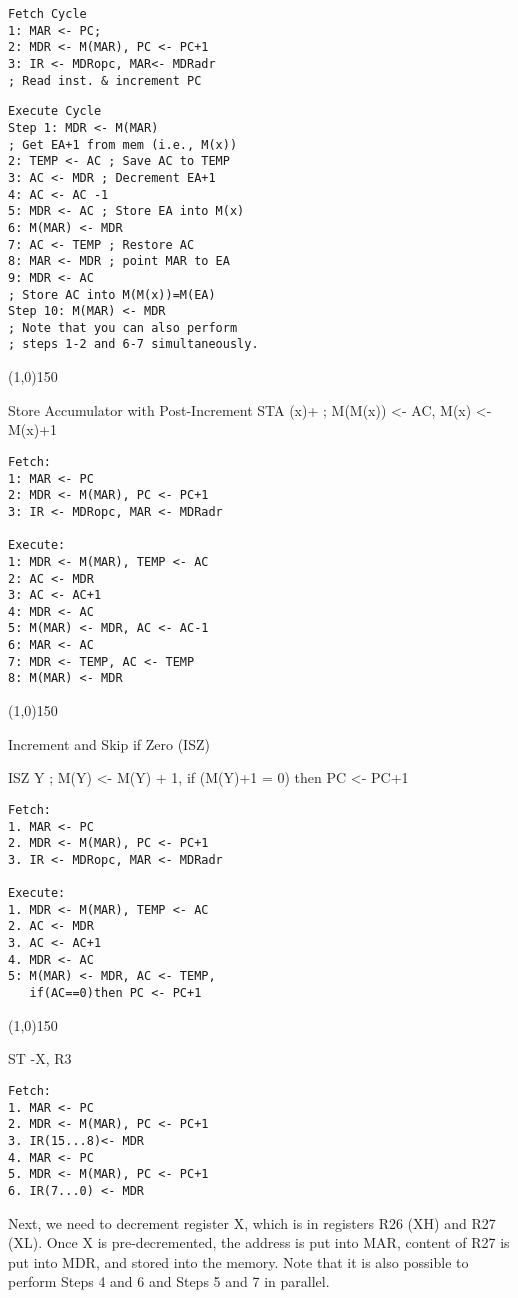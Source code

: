 \documentclass[8pt]{article}
\begin{document}
\begin{multicols}{3}
\begin{verbatim}
Fetch Cycle
1: MAR <- PC;
2: MDR <- M(MAR), PC <- PC+1
3: IR <- MDRopc, MAR<- MDRadr 
; Read inst. & increment PC
\end{verbatim}

\begin{verbatim}
Execute Cycle
Step 1: MDR <- M(MAR) 
; Get EA+1 from mem (i.e., M(x))
2: TEMP <- AC ; Save AC to TEMP
3: AC <- MDR ; Decrement EA+1
4: AC <- AC -1
5: MDR <- AC ; Store EA into M(x)
6: M(MAR) <- MDR
7: AC <- TEMP ; Restore AC
8: MAR <- MDR ; point MAR to EA
9: MDR <- AC 
; Store AC into M(M(x))=M(EA)
Step 10: M(MAR) <- MDR
; Note that you can also perform 
; steps 1-2 and 6-7 simultaneously.
\end{verbatim}


\line(1,0){150}

Store Accumulator with Post-Increment
STA (x)+ ; M(M(x)) <- AC, M(x) <- M(x)+1

\begin{verbatim}
Fetch: 
1: MAR <- PC
2: MDR <- M(MAR), PC <- PC+1
3: IR <- MDRopc, MAR <- MDRadr

Execute: 
1: MDR <- M(MAR), TEMP <- AC
2: AC <- MDR
3: AC <- AC+1
4: MDR <- AC
5: M(MAR) <- MDR, AC <- AC-1
6: MAR <- AC
7: MDR <- TEMP, AC <- TEMP
8: M(MAR) <- MDR
\end{verbatim}

\line(1,0){150}

Increment and Skip if Zero (ISZ)

ISZ Y ; M(Y) <- M(Y) + 1, if (M(Y)+1 = 0) then PC <- PC+1

\begin{verbatim}
Fetch: 
1. MAR <- PC
2. MDR <- M(MAR), PC <- PC+1
3. IR <- MDRopc, MAR <- MDRadr

Execute: 
1. MDR <- M(MAR), TEMP <- AC
2. AC <- MDR
3. AC <- AC+1
4. MDR <- AC
5: M(MAR) <- MDR, AC <- TEMP, 
   if(AC==0)then PC <- PC+1

\end{verbatim}

\line(1,0){150}

ST -X, R3

\begin{verbatim}
Fetch: 
1. MAR <- PC
2. MDR <- M(MAR), PC <- PC+1
3. IR(15...8)<- MDR
4. MAR <- PC
5. MDR <- M(MAR), PC <- PC+1
6. IR(7...0) <- MDR
\end{verbatim}

Next, we need to decrement register X, which is in registers R26 (XH) and R27
(XL). Once X is pre-decremented, the address is put into MAR, content of R27
is put into MDR, and stored into the memory. Note that it is also possible to
perform Steps 4 and 6 and Steps 5 and 7 in parallel. 


\end{multicols}
\end{document}

